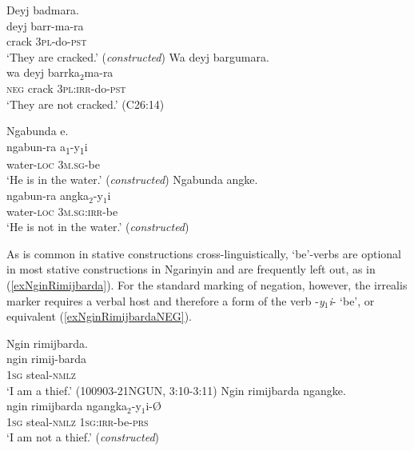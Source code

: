 \documentclass[output=paper,colorlinks,citecolor=brown]{langscibook}
\begin{document}
\begin{exe}
\ex \label{exWaDeyjBarrkumara}
\begin{xlist}
  \ex 
    \glll Deyj badmara.\\
    deyj barr-ma-ra \\
    crack \textsc{3pl}-do-\textsc{pst}\\
    \glt ‘They are cracked.’ (\textit{constructed})
  \ex  
    \glll Wa deyj bargumara.\\
    wa deyj barrka$_2$ma-ra\\
    \textsc{neg} crack 3\textsc{pl:irr}-do-\textsc{pst}\\
    \trans `They are not cracked.' (C26:14)
  \end{xlist}
\end{exe}

\begin{exe}
\ex \label{exNgabundaAngke}
\begin{xlist}
  \ex 
    \glll Ngabunda e.\\
    ngabun-ra a\textsubscript{1}-y\textsubscript{1}i \\
    water-\textsc{loc} \textsc{3m.sg}-be \\
    \glt ‘He is in the water.’ (\textit{constructed})
  \ex
    \glll Ngabunda angke.\\
    ngabun-ra angka$_2$-y$_1$i\\
    water-\textsc{loc} 3\textsc{m.sg:irr}-be\\
    \trans `He is not in the water.' (\textit{constructed})
  \end{xlist}
\end{exe}

As is common in stative constructions cross-linguistically, `be'-verbs are optional in most stative constructions in Ngarinyin and are frequently left out, as in (\ref{exNginRimijbarda}). For the standard marking of negation, however, the irrealis marker requires a verbal host and therefore a form of the verb -\textit{y}$_1$\textit{i}- `be', or equivalent (\ref{exNginRimijbardaNEG}).

\begin{exe}
\ex
\begin{xlist}
\ex \label{exNginRimijbarda} \glll Ngin rimijbarda.\\
ngin rimij-barda\\
1\textsc{sg} steal-\textsc{nmlz}\\
\trans `I am a thief.' (100903-21NGUN, 3:10-3:11)
\ex \label{exNginRimijbardaNEG}
\glll Ngin rimijbarda ngangke.\\
ngin rimijbarda ngangka$_2$-y$_1$i-{\O}\\
1\textsc{sg} steal-\textsc{nmlz} 1\textsc{sg:irr}-be-\textsc{prs}\\
\trans `I am not a thief.' (\textit{constructed})
\end{xlist}
\end{exe}
\end{document}
